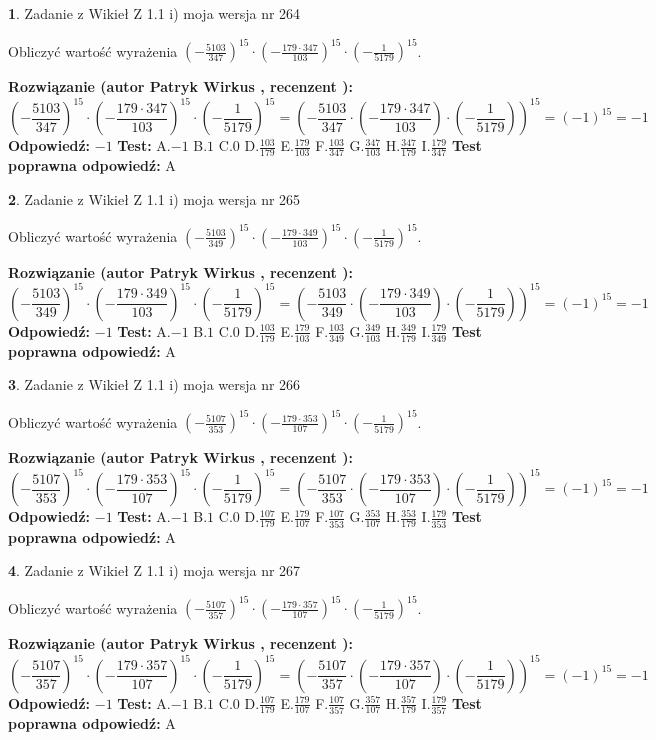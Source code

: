 \documentclass[12pt, a4paper]{article}
\theoremstyle{definition} %
\newtheorem{zad}{}
\newcommand{\zadStart}[1]{\begin{zad}#1\newline}
\newcommand{\zadStop}{\end{zad}}
\newcommand{\rozwStart}[2]{\noindent \textbf{Rozwiązanie (autor #1 , recenzent #2): }\newline}
\newcommand{\rozwStop}{\newline}
\newcommand{\odpStart}{\noindent \textbf{Odpowiedź:}\newline}
\newcommand{\odpStop}{\newline}
\newcommand{\testStart}{\noindent \textbf{Test:}\newline}
\newcommand{\testStop}{\newline}
\newcommand{\kluczStart}{\noindent \textbf{Test poprawna odpowiedź:}\newline}
\newcommand{\kluczStop}{\newline}
\begin{document}
\zadStart{Zadanie z Wikieł Z 1.1 i) moja wersja nr 264}

Obliczyć wartość wyrażenia $(-\frac{5103}{347})^{15} \cdot (-\frac{179 \cdot 347}{103})^{15} \cdot (-\frac{1}{5179})^{15}$.
\zadStop
\rozwStart{Patryk Wirkus}{}
$$(-\frac{5103}{347})^{15} \cdot (-\frac{179 \cdot 347}{103})^{15} \cdot (-\frac{1}{5179})^{15} = (-\frac{5103}{347} \cdot (-\frac{179 \cdot 347}{103}) \cdot (-\frac{1}{5179}))^{15} = (-1)^{15} = -1$$
\rozwStop
\odpStart
$-1$
\odpStop
\testStart
A.$-1$ B.$1$ C.$0$ D.$\frac{103}{179}$ E.$\frac{179}{103}$
F.$\frac{103}{347}$ G.$\frac{347}{103}$
H.$\frac{347}{179}$
I.$\frac{179}{347}$
\testStop
\kluczStart
A
\kluczStop



\zadStart{Zadanie z Wikieł Z 1.1 i) moja wersja nr 265}

Obliczyć wartość wyrażenia $(-\frac{5103}{349})^{15} \cdot (-\frac{179 \cdot 349}{103})^{15} \cdot (-\frac{1}{5179})^{15}$.
\zadStop
\rozwStart{Patryk Wirkus}{}
$$(-\frac{5103}{349})^{15} \cdot (-\frac{179 \cdot 349}{103})^{15} \cdot (-\frac{1}{5179})^{15} = (-\frac{5103}{349} \cdot (-\frac{179 \cdot 349}{103}) \cdot (-\frac{1}{5179}))^{15} = (-1)^{15} = -1$$
\rozwStop
\odpStart
$-1$
\odpStop
\testStart
A.$-1$ B.$1$ C.$0$ D.$\frac{103}{179}$ E.$\frac{179}{103}$
F.$\frac{103}{349}$ G.$\frac{349}{103}$
H.$\frac{349}{179}$
I.$\frac{179}{349}$
\testStop
\kluczStart
A
\kluczStop



\zadStart{Zadanie z Wikieł Z 1.1 i) moja wersja nr 266}

Obliczyć wartość wyrażenia $(-\frac{5107}{353})^{15} \cdot (-\frac{179 \cdot 353}{107})^{15} \cdot (-\frac{1}{5179})^{15}$.
\zadStop
\rozwStart{Patryk Wirkus}{}
$$(-\frac{5107}{353})^{15} \cdot (-\frac{179 \cdot 353}{107})^{15} \cdot (-\frac{1}{5179})^{15} = (-\frac{5107}{353} \cdot (-\frac{179 \cdot 353}{107}) \cdot (-\frac{1}{5179}))^{15} = (-1)^{15} = -1$$
\rozwStop
\odpStart
$-1$
\odpStop
\testStart
A.$-1$ B.$1$ C.$0$ D.$\frac{107}{179}$ E.$\frac{179}{107}$
F.$\frac{107}{353}$ G.$\frac{353}{107}$
H.$\frac{353}{179}$
I.$\frac{179}{353}$
\testStop
\kluczStart
A
\kluczStop



\zadStart{Zadanie z Wikieł Z 1.1 i) moja wersja nr 267}

Obliczyć wartość wyrażenia $(-\frac{5107}{357})^{15} \cdot (-\frac{179 \cdot 357}{107})^{15} \cdot (-\frac{1}{5179})^{15}$.
\zadStop
\rozwStart{Patryk Wirkus}{}
$$(-\frac{5107}{357})^{15} \cdot (-\frac{179 \cdot 357}{107})^{15} \cdot (-\frac{1}{5179})^{15} = (-\frac{5107}{357} \cdot (-\frac{179 \cdot 357}{107}) \cdot (-\frac{1}{5179}))^{15} = (-1)^{15} = -1$$
\rozwStop
\odpStart
$-1$
\odpStop
\testStart
A.$-1$ B.$1$ C.$0$ D.$\frac{107}{179}$ E.$\frac{179}{107}$
F.$\frac{107}{357}$ G.$\frac{357}{107}$
H.$\frac{357}{179}$
I.$\frac{179}{357}$
\testStop
\kluczStart
A
\kluczStop
\end{document}
